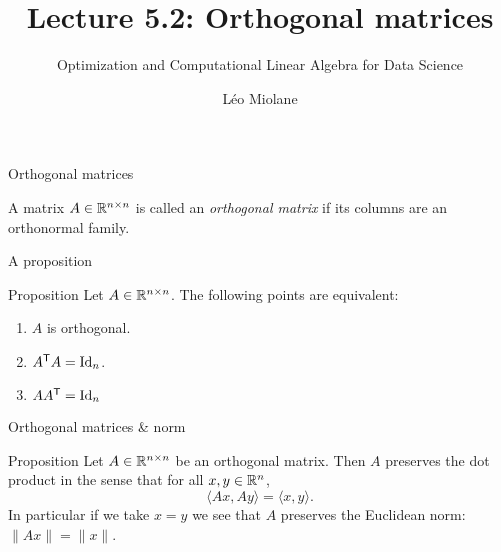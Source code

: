 \documentclass{beamer}
\title{Lecture 5.2: Orthogonal matrices}
\subtitle{Optimization and Computational Linear Algebra for Data Science}
\author{Léo Miolane}
\date{}
\begin{document}
\setcounter{showProgressBar}{0}
\setcounter{showSlideNumbers}{0}

\frame{\titlepage}
\setcounter{framenumber}{0}
\setcounter{showSlideNumbers}{1}

\begin{frame}[t]{Orthogonal matrices}
	\grid

	\begin{definition}
		A matrix $A \in \mathbb{R}^{n \times n}$ is called an \emph{orthogonal matrix} if its columns are an orthonormal family.
	\end{definition}
\end{frame}

\begin{frame}[t]{A proposition}
	\grid

	\vspace{-0.4cm}
	\begin{block}{Proposition}
		Let $A \in \mathbb{R}^{n \times n}$. The following points are equivalent:
		\begin{enumerate}
			\item $A$ is orthogonal.
			\item $A^{{\sf T}} A = {{\rm Id}}_n$.
			\item $A A^{{\sf T}} = {{\rm Id}}_n$
		\end{enumerate}
	\end{block}
\end{frame}

\begin{frame}[t]{Orthogonal matrices \& norm}
	\grid

	\vspace{-0.4cm}
	\begin{block}{Proposition}
	Let $A \in \mathbb{R}^{n \times n}$ be an orthogonal matrix. Then $A$ preserves the dot product in the sense that for all $x,y \in \mathbb{R}^n$,
	$$
	\langle Ax, Ay \rangle = \langle x,y\rangle.
	$$
	In particular if we take $x=y$ we see that $A$ preserves the Euclidean norm: $\|Ax\| = \|x\|$.
\end{block}
\end{frame}




\end{document}
